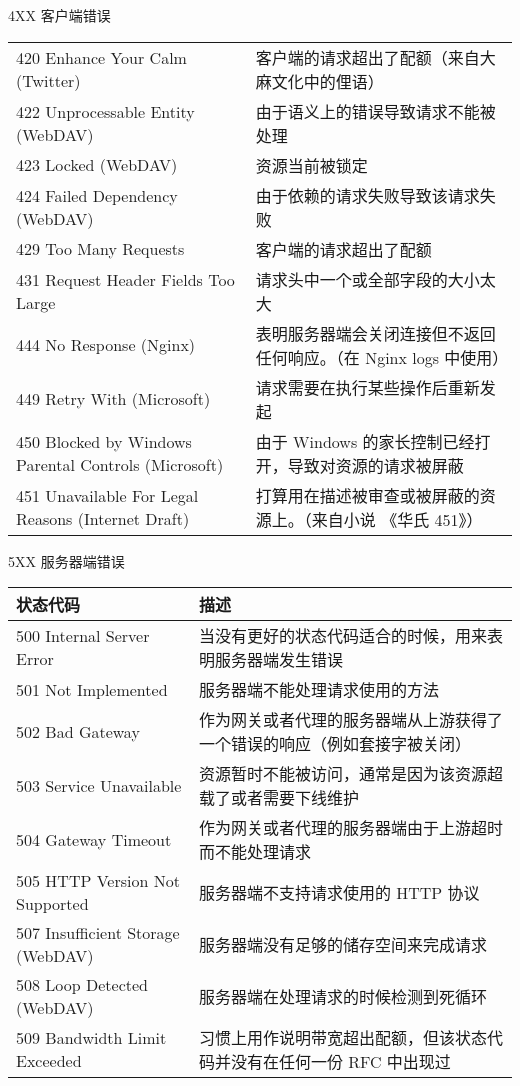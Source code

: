 \documentclass[final,table]{beamer}
\begin{document}
\begin{frame}{}
\begin{block}{\huge 4XX 客户端错误}
\begin{tabular}{p{} p{}}
        420 Enhance Your Calm (Twitter) & 客户端的请求超出了配额（来自大麻文化中的俚语） \\
        422 Unprocessable Entity (WebDAV) & 由于语义上的错误导致请求不能被处理 \\
        423 Locked (WebDAV) & 资源当前被锁定 \\
        424 Failed Dependency (WebDAV) & 由于依赖的请求失败导致该请求失败 \\
        429 Too Many Requests & 客户端的请求超出了配额 \\
        431 Request Header Fields Too Large & 请求头中一个或全部字段的大小太大 \\
        444 No Response (Nginx) & 表明服务器端会关闭连接但不返回任何响应。（在 Nginx logs 中使用） \\
        449 Retry With (Microsoft) & 请求需要在执行某些操作后重新发起 \\
        450 Blocked by Windows Parental Controls (Microsoft) & 由于 Windows 的家长控制已经打开，导致对资源的请求被屏蔽 \\
        451 Unavailable For Legal Reasons (Internet Draft) & 打算用在描述被审查或被屏蔽的资源上。（来自小说 《华氏 451》）
      \end{tabular}
    \end{block}
    \begin{block}{\huge 5XX 服务器端错误}

      \vspace{0.3in}

      \begin{tabular}{p{} p{}}
        状态代码 & 描述 \\ \hline
        500 Internal Server Error & 当没有更好的状态代码适合的时候，用来表明服务器端发生错误 \\
        501 Not Implemented & 服务器端不能处理请求使用的方法 \\
        502 Bad Gateway & 作为网关或者代理的服务器端从上游获得了一个错误的响应（例如套接字被关闭） \\
        503 Service Unavailable & 资源暂时不能被访问，通常是因为该资源超载了或者需要下线维护 \\
        504 Gateway Timeout & 作为网关或者代理的服务器端由于上游超时而不能处理请求 \\
        505 HTTP Version Not Supported & 服务器端不支持请求使用的 HTTP 协议 \\
        507 Insufficient Storage (WebDAV) & 服务器端没有足够的储存空间来完成请求 \\
        508 Loop Detected (WebDAV) & 服务器端在处理请求的时候检测到死循环 \\
        509 Bandwidth Limit Exceeded & 习惯上用作说明带宽超出配额，但该状态代码并没有在任何一份 RFC 中出现过 \\
      \end{tabular}
    \end{block}
  \end{frame}
\end{document}
